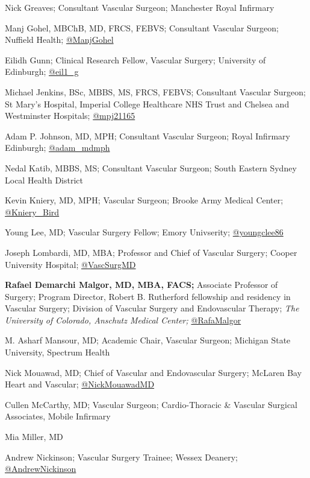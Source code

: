 \documentclass[
]{book}
\begin{document}
Nick Greaves; Consultant Vascular Surgeon; Manchester Royal Infirmary

Manj Gohel, MBChB, MD, FRCS, FEBVS; Consultant Vascular Surgeon; Nuffield Health; \href{https://twitter.com/manjgohel}{@ManjGohel}

Eilidh Gunn; Clinical Research Fellow, Vascular Surgery; University of Edinburgh; \href{https://twitter.com/eil1_g}{@eil1\_g}

Michael Jenkins, BSc, MBBS, MS, FRCS, FEBVS; Consultant Vascular Surgeon; St Mary's Hospital, Imperial College Healthcare NHS Trust and Chelsea and Westminster Hospitals; \href{https://mobile.twitter.com/mpj21165}{@mpj21165}

Adam P. Johnson, MD, MPH; Consultant Vascular Surgeon; Royal Infirmary Edinburgh; \href{https://twitter.com/adam_mdmph?lang=en}{@adam\_mdmph}

Nedal Katib, MBBS, MS; Consultant Vascular Surgeon; South Eastern Sydney Local Health District

Kevin Kniery, MD, MPH; Vascular Surgeon; Brooke Army Medical Center; \href{https://twitter.com/kniery_bird}{@Kniery\_Bird}

Young Lee, MD; Vascular Surgery Fellow; Emory Univserity; \href{https://twitter.com/youngclee86}{@youngclee86}

Joseph Lombardi, MD, MBA; Professor and Chief of Vascular Surgery; Cooper University Hospital; \href{https://twitter.com/vascsurgmd}{@VascSurgMD}

\textbf{Rafael Demarchi Malgor, MD, MBA, FACS;} Associate Professor of Surgery; Program Director, Robert B. Rutherford fellowship and residency in Vascular Surgery; Division of Vascular Surgery and Endovascular Therapy; \emph{The University of Colorado, Anschutz Medical Center;} \href{https://twitter.com/rafamalgor}{@RafaMalgor}

M. Asharf Mansour, MD; Academic Chair, Vascular Surgeon; Michigan State University, Spectrum Health

Nick Mouawad, MD; Chief of Vascular and Endovascular Surgery; McLaren Bay Heart and Vascular; \href{https://twitter.com/nickmouawadmd?lang=en}{@NickMouawadMD}

Cullen McCarthy, MD; Vascular Surgeon; Cardio-Thoracic \& Vascular Surgical Associates, Mobile Infirmary

Mia Miller, MD

Andrew Nickinson; Vascular Surgery Trainee; Wessex Deanery; \href{https://twitter.com/andrewnickinson}{@AndrewNickinson}
\end{document}
